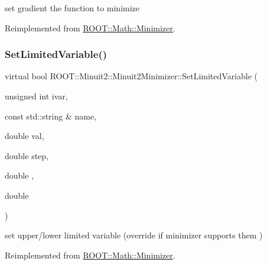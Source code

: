 set gradient the function to minimize 



Reimplemented from \mbox{\hyperlink{classROOT_1_1Math_1_1Minimizer_a1d9ff15aa732e518a60a05dcbd82c34a}{R\+O\+O\+T\+::\+Math\+::\+Minimizer}}.

\mbox{\label{classROOT_1_1Minuit2_1_1Minuit2Minimizer_a30385295df6a6b784aa59de7f00e4d23}} 
\subsubsection{\texorpdfstring{SetLimitedVariable()}{SetLimitedVariable()}\hspace{0.1cm}{\footnotesize\ttfamily [1/2]}}
{\footnotesize\ttfamily virtual bool R\+O\+O\+T\+::\+Minuit2\+::\+Minuit2\+Minimizer\+::\+Set\+Limited\+Variable (\begin{DoxyParamCaption}\item[{unsigned int}]{ivar,  }\item[{const std\+::string \&}]{name,  }\item[{double}]{val,  }\item[{double}]{step,  }\item[{double}]{,  }\item[{double}]{ }\end{DoxyParamCaption})\hspace{0.3cm}{\ttfamily [virtual]}}



set upper/lower limited variable (override if minimizer supports them ) 



Reimplemented from \mbox{\hyperlink{classROOT_1_1Math_1_1Minimizer_a4303530cbb62ceb7cf9c9ebcbde530c2}{R\+O\+O\+T\+::\+Math\+::\+Minimizer}}.

\mbox{\label{classROOT_1_1Minuit2_1_1Minuit2Minimizer_a30385295df6a6b784aa59de7f00e4d23}} 
